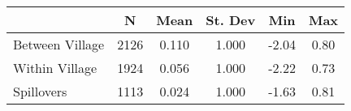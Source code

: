 \begin{tabular}{l*{5}{c}}\hline&\multicolumn{1}{c}{N}&\multicolumn{1}{c}{Mean}&\multicolumn{1}{c}{St. Dev}&\multicolumn{1}{c}{Min}&\multicolumn{1}{c}{Max}\\ \hline 
Between Village & 2126 & 0.110 & 1.000 & -2.04 & 0.80 \\
Within Village & 1924 & 0.056 & 1.000 & -2.22 & 0.73 \\
Spillovers & 1113 & 0.024 & 1.000 & -1.63 & 0.81 \\
\hline \end{tabular}

